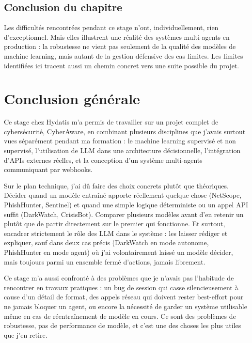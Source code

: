 \documentclass[12pt,a4paper]{report}
\begin{document}
\section{Conclusion du chapitre}

Les difficultés rencontrées pendant ce stage n'ont, individuellement, rien d'exceptionnel. Mais elles illustrent une réalité des systèmes multi-agents en production : la robustesse ne vient pas seulement de la qualité des modèles de machine learning, mais autant de la gestion défensive des cas limites. Les limites identifiées ici tracent aussi un chemin concret vers une suite possible du projet.

\chapter*{Conclusion générale}

Ce stage chez Hydatis m'a permis de travailler sur un projet complet de cybersécurité, CyberAware, en combinant plusieurs disciplines que j'avais surtout vues séparément pendant ma formation : le machine learning supervisé et non supervisé, l'utilisation de LLM dans une architecture décisionnelle, l'intégration d'APIs externes réelles, et la conception d'un système multi-agents communiquant par webhooks.

Sur le plan technique, j'ai dû faire des choix concrets plutôt que théoriques. Décider quand un modèle entraîné apporte réellement quelque chose (NetScope, PhishHunter, Sentinel) et quand une simple logique déterministe ou un appel API suffit (DarkWatch, CrisisBot). Comparer plusieurs modèles avant d'en retenir un plutôt que de partir directement sur le premier qui fonctionne. Et surtout, encadrer strictement le rôle des LLM dans le système : les laisser rédiger et expliquer, sauf dans deux cas précis (DarkWatch en mode autonome, PhishHunter en mode agent) où j'ai volontairement laissé un modèle décider, mais toujours parmi un ensemble fermé d'actions, jamais librement.

Ce stage m'a aussi confronté à des problèmes que je n'avais pas l'habitude de rencontrer en travaux pratiques : un bug de session qui casse silencieusement à cause d'un détail de format, des appels réseau qui doivent rester best-effort pour ne jamais bloquer un agent, ou encore la nécessité de garder un système utilisable même en cas de réentraînement de modèle en cours. Ce sont des problèmes de robustesse, pas de performance de modèle, et c'est une des choses les plus utiles que j'en retire.
\end{document}
